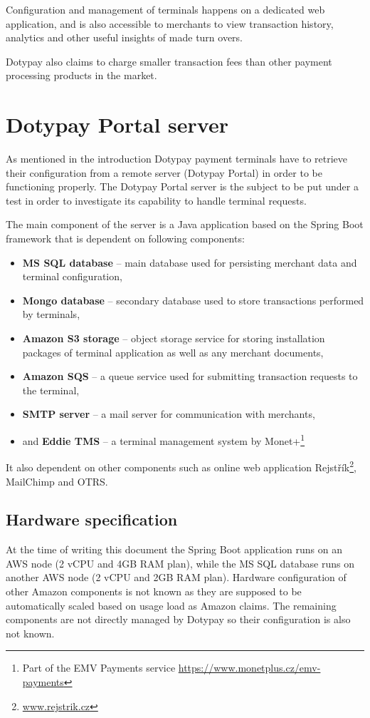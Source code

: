 \documentclass[12pt, a4paper]{article}
\let\oldsection\section
\renewcommand\section{\clearpage\oldsection}
\begin{document}
Configuration and management of terminals happens on a dedicated web application, and is also accessible to merchants to view transaction history, analytics and other useful insights of made turn overs.

Dotypay also claims to charge smaller transaction fees than other payment processing products in the market.


\section{Dotypay Portal server}

As mentioned in the introduction Dotypay payment terminals have to retrieve their configuration from a remote server (Dotypay Portal) in order to be functioning properly. 
The Dotypay Portal server is the subject to be put under a test in order to investigate its capability to handle terminal requests.

The main component of the server is a Java application based on the Spring Boot framework that is dependent on following components:

\begin{itemize}
    \item \textbf{MS SQL database} -- main database used for persisting merchant data and terminal configuration,
    \item \textbf{Mongo database}  -- secondary database used to store transactions performed by terminals,
    \item \textbf{Amazon S3 storage}  -- object storage service for storing installation packages of terminal application as well as any merchant documents,
    \item \textbf{Amazon SQS} -- a queue service used for submitting transaction requests to the terminal,
    \item \textbf{SMTP server} -- a mail server for communication with merchants,
    \item and \textbf{Eddie TMS} -- a terminal management system by Monet+\footnote{Part of the EMV Payments service \url{https://www.monetplus.cz/emv-payments}}
\end{itemize}

It also dependent on other components such as online web application Rejstřík\footnote{\url{www.rejstrik.cz}}, MailChimp and OTRS.

\subsection{Hardware specification}
At the time of writing this document the Spring Boot application runs on an AWS node (2 vCPU and 4GB RAM plan), while the MS SQL database runs on another AWS node (2 vCPU and 2GB RAM plan).
Hardware configuration of other Amazon components is not known as they are supposed to be automatically scaled based on usage load as Amazon claims. The remaining components are not directly managed by Dotypay so their configuration is also not known. 
\end{document}
